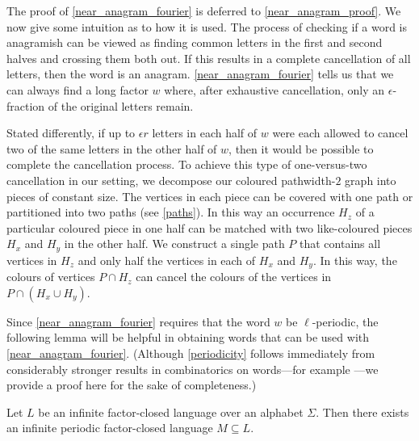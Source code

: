 \documentclass{patmorin}
\begin{document}
The proof of \cref{near_anagram_fourier} is deferred to \cref{near_anagram_proof}.  We now give some intuition as to how it is used.  The process of checking if a word is anagramish can be viewed as finding common letters in the first and second halves and crossing them both out.  If this results in a complete cancellation of all letters, then the word is an anagram.  \cref{near_anagram_fourier} tells us that we can always find a long factor $w$ where, after exhaustive cancellation, only an $\epsilon$-fraction of the original letters remain.

Stated differently, if up to $\epsilon r$ letters in each half of $w$ were each allowed to cancel two of the same letters in the other half of $w$, then it would be possible to complete the cancellation process.  To achieve this type of one-versus-two cancellation in our setting, we decompose our coloured pathwidth-$2$ graph into pieces of constant size.  The vertices in each piece can be covered with one path or partitioned into two paths (see \cref{paths}).  In this way an occurrence $H_z$ of a particular coloured piece in one half can be matched with two like-coloured pieces $H_x$ and $H_y$ in the other half. We construct a single path $P$ that contains all vertices in $H_z$ and only half the vertices in each of $H_x$ and $H_y$.  In this way, the colours of vertices $P\cap H_z$ can cancel the colours of the vertices in $P\cap(H_x\cup H_y)$.

Since \cref{near_anagram_fourier} requires that the word $w$ be $\ell$-periodic, the following lemma will be helpful in obtaining words that can be used with \cref{near_anagram_fourier}. (Although \cref{periodicity} follows immediately from considerably stronger results in combinatorics on words---for example \citet[Proposition~1.5.12]{lothaire:algebraic}---we provide a proof here for the sake of completeness.)


\begin{lem}\label{periodicity}
    Let $L$ be an infinite factor-closed language over an alphabet $\Sigma$.  Then there exists an infinite periodic factor-closed language $M\subseteq L$.
\end{lem}
\end{document}
